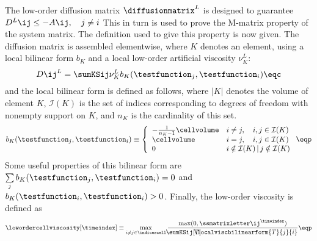 The low-order diffusion matrix $\diffusionmatrix^L$ is designed to
guarantee $D^L\ij \leq -A\ij, \quad j\ne i$
This in turn is used to prove the M-matrix property of the system matrix.
The definition used to give this property is now given.
The diffusion matrix is assembled elementwise,
where $K$ denotes an element, using a local bilinear form $b_K$ and a
local low-order artificial viscosity $\nu_K^L$:
\begin{equation}
  D\ij^L = \sumKSij \nu_K^L b_K(\testfunction_j,\testfunction_i) \eqc
\end{equation}
and the local bilinear form is defined as follows, where $|K|$ denotes
the volume of element $K$, $\mathcal{I}(K)$ is the set of indices
corresponding to degrees of freedom with nonempty support on $K$, and
$n_K$ is the cardinality of this set.
\begin{equation}
  b_K(\testfunction_j, \testfunction_i) \equiv \left\{\begin{array}{l l}
    -\frac{1}{n_K - 1}\cellvolume & i\ne j, \quad i,j\in \mathcal{I}(K)\\
    \cellvolume                   & i = j,  \quad i,j\in \mathcal{I}(K)\\
    0                & i\notin\mathcal{I}(K)\,|\, j\notin\mathcal{I}(K)
  \end{array}\right. \eqp
\end{equation}
Some useful properties of this bilinear form are
$\sum\limits_j b_K(\testfunction_j, \testfunction_i) = 0$ and
$b_K(\testfunction_i, \testfunction_i) > 0$.
Finally, the low-order viscosity is defined as
\begin{equation}
  \lowordercellviscosity[\timeindex] \equiv \max\limits_{i\ne j\in\indicescell}
  \frac{\max(0,\ssmatrixletter\ij^\timeindex)}
  {-\mkern-20mu\sumKSij[T]\mkern-20mu\localviscbilinearform{T}{j}{i}}
  \eqp
\end{equation}

